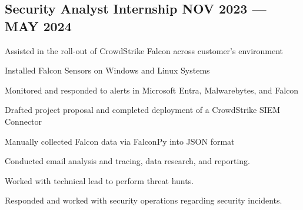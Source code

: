 \documentclass[letter,10pt]{article}
\begin{document}
\subsection{Security Analyst Internship \hfill NOV 2023 --- MAY 2024}
\begin{zitemize}
\item Assisted in the roll-out of CrowdStrike Falcon across customer's environment
\item Installed Falcon Sensors on Windows and Linux Systems
\item Monitored and responded to alerts in Microsoft Entra, Malwarebytes, and Falcon
\item Drafted project proposal and completed deployment of a CrowdStrike SIEM Connector
\item Manually collected Falcon data via FalconPy into JSON format 
\item Conducted email analysis and tracing, data research, and reporting.
\item Worked with technical lead to perform threat hunts.
\item Responded and worked with security operations regarding security incidents.
\end{zitemize}

\end{document}
